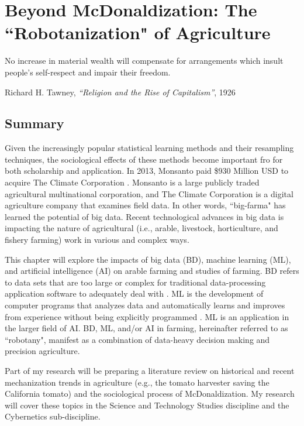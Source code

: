 \chapter[Beyond McDonaldization]{Beyond McDonaldization: The ``Robotanization" of Agriculture} \label{ch6:sociology}
\setlength{\epigraphwidth}{4.5in}
\epigraph{No increase in material wealth will compensate for arrangements which insult people's self-respect and impair their freedom.}{Richard H. Tawney, \textit{``Religion and the Rise of Capitalism''}, 1926}

\section*{Summary} 
Given the increasingly popular statistical learning methods and their resampling techniques, the sociological effects of these methods become important fro for both scholarship and application. In 2013, Monsanto paid \$930 Million USD to acquire The Climate Corporation \cite{frobes2013merger}. Monsanto is a large publicly traded agricultural multinational corporation, and The Climate Corporation is a digital agriculture company that examines field data. In other words, ``big-farma" has learned the potential of big data. Recent technological advances in big data is impacting the nature of agricultural (i.e., arable, livestock, horticulture, and fishery farming) work in various and complex ways. 

This chapter will explore the impacts of big data (BD), machine learning (ML), and artificial intelligence (AI) on arable farming and studies of farming. BD refers to data sets that are too large or complex for traditional data-processing application software to adequately deal with \cite{wiki2018bigdata}. ML is the development of computer programs that analyzes data and automatically learns and improves from experience without being explicitly programmed \cite{koza1996automated}.  ML is an application in the larger field of AI. BD, ML, and/or AI in farming, hereinafter referred to as ``robotany", manifest as a combination of data-heavy decision making and precision agriculture. 

Part of my research will be preparing a literature review on historical and recent mechanization trends in agriculture (e.g., the tomato harvester saving the California tomato) and the sociological process of McDonaldization. My research will cover these topics in the Science and Technology Studies discipline and the Cybernetics sub-discipline.

